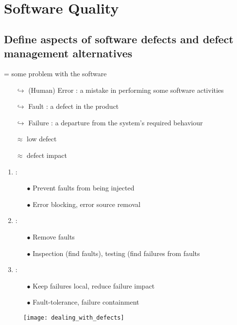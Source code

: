 \chapter{Software Quality}

\section{Define aspects of software defects and defect management alternatives}

 = some problem with the software
\begin{itemize}
    \item[$\hookrightarrow$] (Human) Error : a mistake in performing some software activities
    \item[$\hookrightarrow$] Fault : a defect in the product
    \item[$\hookrightarrow$] Failure : a departure from the system's required behaviour
    \item[]  $\approx$ low defect
    \item[]  $\approx$ defect impact
\end{itemize}


\begin{minipage}{0.48\textwidth}
\begin{enumerate}
        \item {} :
        \begin{itemize}
            \item [$\bullet$]Prevent faults from being injected
            \item [$\bullet$]Error blocking, error source removal
        \end{itemize}
        \item {} :
        \begin{itemize}
            \item [$\bullet$]Remove faults
            \item [$\bullet$]Inspection (find faults), testing (find failures from faults
        \end{itemize}
        \item {} :
        \begin{itemize}
            \item [$\bullet$]Keep failures local, reduce failure impact
            \item [$\bullet$]Fault-tolerance, failure containment
        \end{itemize}
    \end{enumerate}
\end{minipage}
\hfill
\begin{minipage}{0.48\textwidth}
    \begin{figure}[H]
        \centering
        \texttt{[image: dealing\_with\_defects]}
    \end{figure}
\end{minipage}


